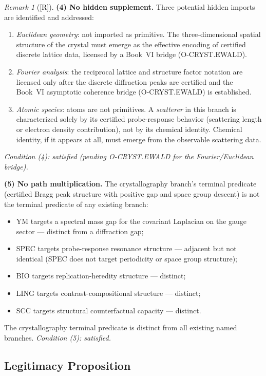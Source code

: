 \documentclass[12pt,oneside]{amsbook}
\theoremstyle{plain}
\theoremstyle{definition}
\theoremstyle{remark}
\newtheorem{remark}[theorem]{Remark}
\newcommand{\status}[1]{\textup{[#1]}}
\begin{document}
\begin{remark}[\status{R}]
\medskip
\textbf{(4) No hidden supplement.}
Three potential hidden imports are identified and addressed:
\begin{enumerate}[label=\textup{(\alph*)}]
  \item \emph{Euclidean geometry}: not imported as primitive.  The
    three-dimensional spatial structure of the crystal must emerge
    as the effective encoding of certified discrete lattice data,
    licensed by a Book~VI bridge (O-CRYST.EWALD).
  \item \emph{Fourier analysis}: the reciprocal lattice and
    structure factor notation are licensed only after the discrete
    diffraction peaks are certified and the Book~VI asymptotic
    coherence bridge (O-CRYST.EWALD) is established.
  \item \emph{Atomic species}: atoms are not primitives.  A
    \emph{scatterer} in this branch is characterized solely by
    its certified probe-response behavior (scattering length or
    electron density contribution), not by its chemical identity.
    Chemical identity, if it appears at all, must emerge from the
    observable scattering data.
\end{enumerate}
\emph{Condition (4): satisfied (pending O-CRYST.EWALD for the
Fourier/Euclidean bridge).}

\medskip
\textbf{(5) No path multiplication.}
The crystallography branch's terminal predicate (certified Bragg
peak structure with positive gap and space group descent) is not
the terminal predicate of any existing branch:
\begin{itemize}
  \item YM targets a spectral mass gap for the covariant Laplacian
    on the gauge sector --- distinct from a diffraction gap;
  \item SPEC targets probe-response resonance structure --- adjacent
    but not identical (SPEC does not target periodicity or space
    group structure);
  \item BIO targets replication-heredity structure --- distinct;
  \item LING targets contrast-compositional structure --- distinct;
  \item SCC targets structural counterfactual capacity --- distinct.
\end{itemize}
The crystallography terminal predicate is distinct from all existing
named branches.  \emph{Condition (5): satisfied.}
\end{remark}

\subsection{Legitimacy Proposition}
\end{document}
